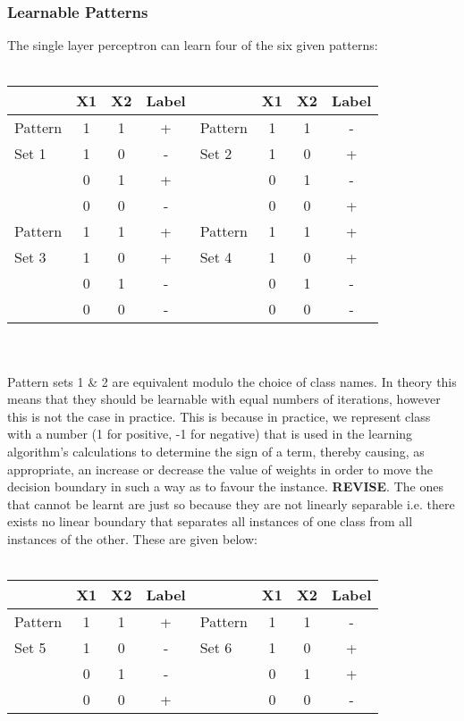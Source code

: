 \documentclass{article}
\begin{document}
\subsubsection*{Learnable Patterns}
The single layer perceptron can learn four of the six given patterns:
\\\\
\begin{tabular}{ l | c c c | l | c c c }
            & X1 & X2 & Label &         & X1 & X2 & Label \\
    \hline
    Pattern & 1  & 1  & +     & Pattern & 1  & 1  & -     \\
    Set 1   & 1  & 0  & -     & Set 2   & 1  & 0  & +     \\
            & 0  & 1  & +     &         & 0  & 1  & -     \\
            & 0  & 0  & -     &         & 0  & 0  & +     \\
    \hline
    Pattern & 1  & 1  & +     & Pattern & 1  & 1  & +     \\
    Set 3   & 1  & 0  & +     & Set 4   & 1  & 0  & +     \\
            & 0  & 1  & -     &         & 0  & 1  & -     \\
            & 0  & 0  & -     &         & 0  & 0  & -     \\
\end{tabular}
\\\\
Pattern sets 1 \& 2 are equivalent modulo the choice of class names. In theory this means that they should be learnable with equal numbers of iterations, however this is not the case in practice. This is because in practice, we represent class with a number (1 for positive, -1 for negative) that is used in the learning algorithm's calculations to determine the sign of a term, thereby causing, as appropriate, an increase or decrease the value of weights in order to move the decision boundary in such a way as to favour the instance. \textbf{REVISE}. The ones that cannot be learnt are just so because they are not linearly separable i.e. there exists no linear boundary that separates all instances of one class from all instances of the other. These are given below:
\\\\
\begin{tabular}{ l | c c c | l | c c c }
            & X1 & X2 & Label &         & X1 & X2 & Label \\
    \hline
    Pattern & 1  & 1  & +     & Pattern & 1  & 1  & -     \\
    Set 5   & 1  & 0  & -     & Set 6   & 1  & 0  & +     \\
            & 0  & 1  & -     &         & 0  & 1  & +     \\
            & 0  & 0  & +     &         & 0  & 0  & -     \\
\end{tabular}
\\\\
\end{document}
